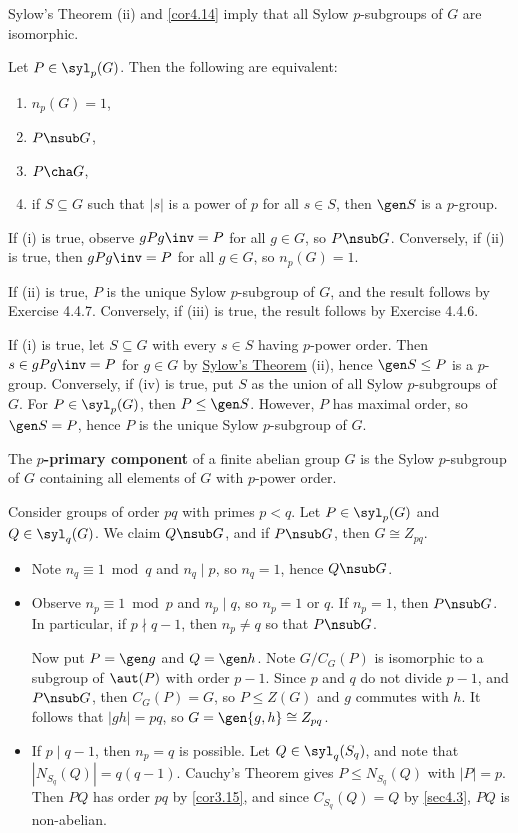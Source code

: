 \note Sylow's Theorem (ii) and \autoref{cor4.14} imply that all Sylow $p$-subgroups of $G$ are isomorphic.

 \label{cor4.20}
Let $P \in \syl_p(G)$. Then the following are equivalent:
\begin{enumerate}
    \item $n_p(G) = 1$,
    \item $P \nsub G$,
    \item $P \cha G$,
    \item if $S \subseteq G$ such that $|s|$ is a power of $p$ for all $s \in S$, then $\gen S$ is a $p$-group.
\end{enumerate}

\begin{proofitem}
    \item If (i) is true, observe $gPg\inv = P$ for all $g \in G$, so $P \nsub G$. Conversely, if (ii) is true, then $gPg\inv = P$ for all $g \in G$, so $n_p(G) = 1$.
    \item If (ii) is true, $P$ is the unique Sylow $p$-subgroup of $G$, and the result follows by Exercise 4.4.7. Conversely, if (iii) is true, the result follows by Exercise 4.4.6.
    \item If (i) is true, let $S \subseteq G$ with every $s \in S$ having $p$-power order. Then $s \in gPg\inv = P$ for $g \in G$ by \hyperref[theo4.18]{Sylow's Theorem} (ii), hence $\gen S \leq P$ is a $p$-group. Conversely, if (iv) is true, put $S$ as the union of all Sylow $p$-subgroups of $G$. For $P \in \syl_p(G)$, then $P \leq \gen S$. However, $P$ has maximal order, so $\gen S = P$, hence $P$ is the unique Sylow $p$-subgroup of $G$.
\end{proofitem}

 The \textbf{$p$-primary component} of a finite abelian group $G$ is the Sylow $p$-subgroup of $G$ containing all elements of $G$ with $p$-power order.

\ex Consider groups of order $pq$ with primes $p < q$. Let $P \in \syl_p(G)$ and $Q \in \syl_q(G)$. We claim $Q \nsub G$, and if $P \nsub G$, then $G \cong Z_{pq}$.
\begin{itemize}
    \item Note $n_q \equiv 1 \bmod q$ and $n_q \mid p$, so $n_q = 1$, hence $Q \nsub G$.
    \item Observe $n_p \equiv 1 \bmod p$ and $n_p \mid q$, so $n_p = 1$ or $q$. If $n_p = 1$, then $P \nsub G$. In particular, if $p \nmid q - 1$, then $n_p \neq q$ so that $P \nsub G$.
    
    Now put $P = \gen g$ and $Q = \gen h$. Note $G/C_G(P)$ is isomorphic to a subgroup of $\aut(P)$ with order $p - 1$. Since $p$ and $q$ do not divide $p - 1$, and $P \nsub G$, then $C_G(P) = G$, so $P \leq Z(G)$ and $g$ commutes with $h$. It follows that $|gh| = pq$, so $G = \gen{g, h} \cong Z_{pq}$.
    \item If $p \mid q - 1$, then $n_p = q$ is possible. Let $Q \in \syl_q(S_q)$, and note that $|N_{S_q}(Q)| = q(q - 1)$. Cauchy's Theorem gives $P \leq N_{S_q}(Q)$ with $|P| = p$. Then $PQ$ has order $pq$ by \autoref{cor3.15}, and since $C_{S_q}(Q) = Q$ by \autoref{sec4.3}, $PQ$ is non-abelian.
\end{itemize}

